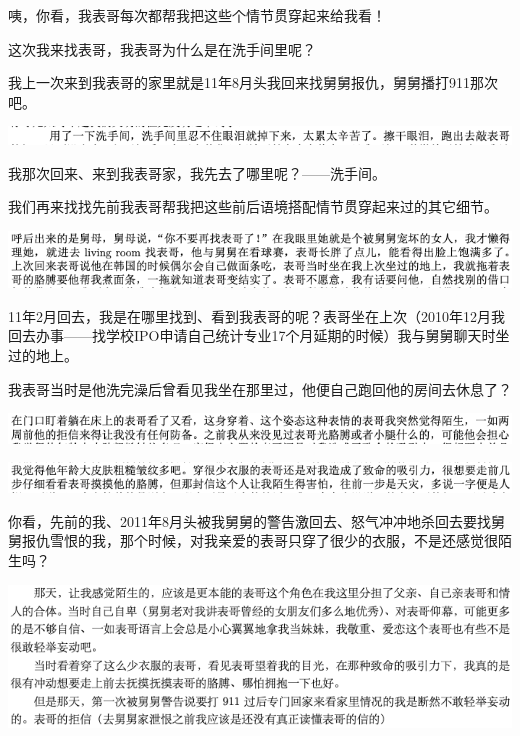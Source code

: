 \documentclass[9pt, b5paper]{article}
\begin{document}
咦，你看，我表哥每次都帮我把这些个情节贯穿起来给我看！

这次我来找表哥，我表哥为什么是在洗手间里呢？

我上一次来到我表哥的家里就是11年8月头我回来找舅舅报仇，舅舅播打911那次吧。

\begin{center}
\includegraphics[width=.9\linewidth]{./pic/backups_plans_20210502_105502.png}
\end{center}

我那次回来、来到我表哥家，我先去了哪里呢？——洗手间。 

我们再来找找先前我表哥帮我把这些前后语境搭配情节贯穿起来过的其它细节。

\begin{center}
\includegraphics[width=.9\linewidth]{./pic/backups_plans_20210502_105754.png}
\end{center}

11年2月回去，我是在哪里找到、看到我表哥的呢？表哥坐在上次（2010年12月我回去办事——找学校IPO申请自己统计专业17个月延期的时候）我与舅舅聊天时坐过的地上。

我表哥当时是他洗完澡后曾看见我坐在那里过，他便自己跑回他的房间去休息了？

\begin{center}
\includegraphics[width=.9\linewidth]{./pic/backups_plans_20210502_110750.png}
\end{center}

\begin{center}
\includegraphics[width=.9\linewidth]{./pic/backups_plans_20210502_110807.png}
\end{center}

你看，先前的我、2011年8月头被我舅舅的警告激回去、怒气冲冲地杀回去要找舅舅报仇雪恨的我，那个时候，对我亲爱的表哥只穿了很少的衣服，不是还感觉很陌生吗？

\begin{center}
\includegraphics[width=.9\linewidth]{./pic/backups_plans_20210502_110919.png}
\end{center}
\end{document}
